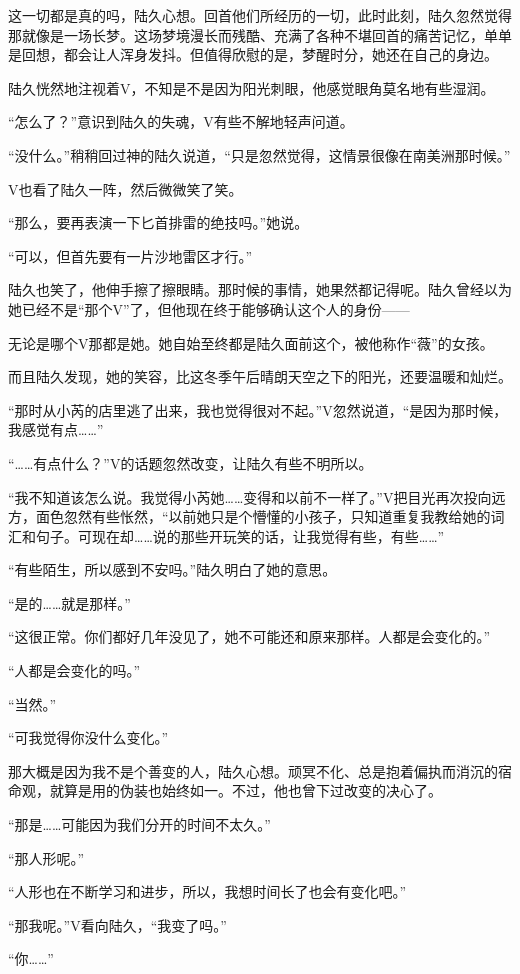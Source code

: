 这一切都是真的吗，陆久心想。回首他们所经历的一切，此时此刻，陆久忽然觉得那就像是一场长梦。这场梦境漫长而残酷、充满了各种不堪回首的痛苦记忆，单单是回想，都会让人浑身发抖。但值得欣慰的是，梦醒时分，她还在自己的身边。

陆久恍然地注视着V，不知是不是因为阳光刺眼，他感觉眼角莫名地有些湿润。

“怎么了？”意识到陆久的失魂，V有些不解地轻声问道。

“没什么。”稍稍回过神的陆久说道，“只是忽然觉得，这情景很像在南美洲那时候。”

V也看了陆久一阵，然后微微笑了笑。

“那么，要再表演一下匕首排雷的绝技吗。”她说。

“可以，但首先要有一片沙地雷区才行。”

陆久也笑了，他伸手擦了擦眼睛。那时候的事情，她果然都记得呢。陆久曾经以为她已经不是“那个V”了，但他现在终于能够确认这个人的身份——

无论是哪个V那都是她。她自始至终都是陆久面前这个，被他称作“薇”的女孩。

而且陆久发现，她的笑容，比这冬季午后晴朗天空之下的阳光，还要温暖和灿烂。

“那时从小芮的店里逃了出来，我也觉得很对不起。”V忽然说道，“是因为那时候，我感觉有点……”

“……有点什么？”V的话题忽然改变，让陆久有些不明所以。

“我不知道该怎么说。我觉得小芮她……变得和以前不一样了。”V把目光再次投向远方，面色忽然有些怅然，“以前她只是个懵懂的小孩子，只知道重复我教给她的词汇和句子。可现在却……说的那些开玩笑的话，让我觉得有些，有些……”

“有些陌生，所以感到不安吗。”陆久明白了她的意思。

“是的……就是那样。”

“这很正常。你们都好几年没见了，她不可能还和原来那样。人都是会变化的。”

“人都是会变化的吗。”

“当然。”

“可我觉得你没什么变化。”

那大概是因为我不是个善变的人，陆久心想。顽冥不化、总是抱着偏执而消沉的宿命观，就算是用的伪装也始终如一。不过，他也曾下过改变的决心了。

“那是……可能因为我们分开的时间不太久。”

“那人形呢。”

“人形也在不断学习和进步，所以，我想时间长了也会有变化吧。”

“那我呢。”V看向陆久，“我变了吗。”

“你……”

